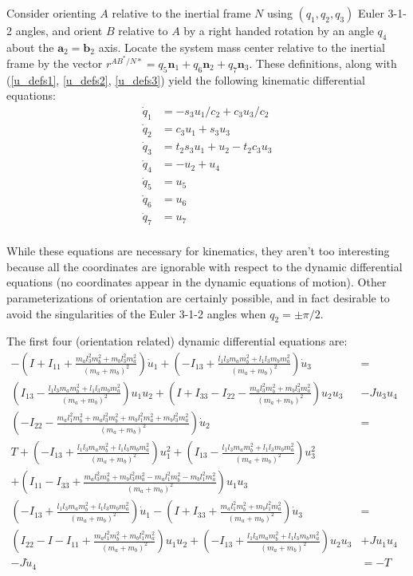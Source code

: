 \documentclass[letterpaper,11pt]{article}
\newcommand{\bs}[1]{ \boldsymbol{ #1 } }
\begin{document}
Consider orienting $A$ relative to the inertial frame $N$ using $(q_1, q_2,
q_3)$ Euler 3-1-2 angles, and orient $B$ relative to $A$ by a right handed
rotation by an angle $q_4$ about the $\bs{a}_2 = \bs{b}_2$ axis. Locate the
system mass center relative to the inertial frame by the vector $r^{AB^*/N*} =
q_5\bs{n}_1 + q_6\bs{n}_2 + q_7\bs{n}_3$.  These definitions, along with
(\ref{u_defs1}, \ref{u_defs2}, \ref{u_defs3}) yield the following kinematic
differential equations:
\begin{align*}
  \dot{q}_1 &=  -s_3u_1/c_2 + c_3u_3/c_2\\
  \dot{q}_2 &=  c_3u_1 + s_3u_3 \\
  \dot{q}_3 &=  t_2s_3u_1 + u_2 - t_2c_3u_3 \\
  \dot{q}_4 &= -u_2 +  u_4 \\
  \dot{q}_5 &= u_5 \\
  \dot{q}_6 &= u_6 \\
  \dot{q}_7 &= u_7 \\
\end{align*}

While these equations are necessary for kinematics, they aren't too interesting
because all the coordinates are ignorable with respect to the dynamic
differential equations (no coordinates appear in the dynamic equations of
motion).  Other parameterizations of orientation are certainly possible, and in
fact desirable to avoid the singularities of the Euler 3-1-2 angles when $q_2 =
\pm \pi/2$.

The first four (orientation related) dynamic differential equations are:
\begin{align*}
  -\left(I + I_{11} + \frac{m_al_3^2m_b^2 + m_bl_3^2m_a^2}{(m_a +
  m_b)^2}\right)\dot{u}_{1}
  + \left(-I_{13} + \frac{l_1l_3m_am_b^2 + l_1l_3m_bm_a^2}{(m_a + m_b)^2}\right)\dot{u}_{3}
  & = \\
  \left(I_{13} - \frac{l_1l_3m_am_b^2 + l_1l_3m_bm_a^2}{(m_a + m_b)^2}\right)u_1u_2 +
  \left(I + I_{33} - I_{22} - \frac{m_al_3^2m_b^2 + m_bl_3^2m_a^2}{(m_a +
  m_b)^2}\right)u_2u_3 &- Ju_3u_4 &
  \\
  \left(-I_{22} - \frac{m_al_1^2m_b^2 + m_al_3^2m_b^2 + m_bl_1^2m_a^2 +
  m_bl_3^2m_a^2}{(m_a + m_b)^2}\right) \dot{u}_2
  & = \\
  T + \left(-I_{13} + \frac{l_1l_3m_am_b^2 + l_1l_3m_bm_a^2}{(m_a +
  m_b)^2}\right)u_1^2
  + \left(I_{13} - \frac{l_1l_3m_am_b^2 + l_1l_3m_bm_a^2}{(m_a +
  m_b)^2}\right)u_3^2 &
  \\
  +\left(I_{11} - I_{33} + \frac{m_al_3^2m_b^2 + m_bl_3^2m_a^2 -
  m_al_1^2m_b^2 - m_bl_1^2m_a^2}{(m_a + m_b)^2}\right)u_1u_3 &
  \\
  \left(-I_{13} + \frac{l_1l_3m_am_b^2 + l_1l_3m_bm_a^2}{(m_a + m_b)^2}\right)
  \dot{u}_1 -
  \left(I + I_{33} + \frac{m_al_1^2m_b^2 + m_bl_1^2m_a^2}{(m_a + m_b)^2}
  \right) \dot{u}_3
  & = \\
  \left(I_{22} - I - I_{11} + \frac{m_al_1^2m_b^2 +
  m_bl_1^2m_a^2}{(m_a + m_b)^2}\right)u_1u_2 + \left(-I_{13} + \frac{l_1l_3m_am_b^2 + l_1l_3m_bm_a^2}{(m_a +
  m_b)^2}\right)u_2u_3 &+ Ju_1u_4\\
  -J\dot{u}_4 &=  -T
\end{align*}
\end{document}
